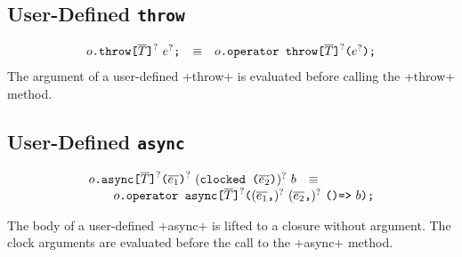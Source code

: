 \subsection{User-Defined \texttt{throw}}

$$
\begin{array}{rcl}
  {o}\texttt{.throw}\texttt{[}{\overline{T}}\texttt{]}^?~{e}^?\texttt{;}
  & \equiv &
  {o}\texttt{.operator throw}\texttt{[}{\overline{T}}\texttt{]}^?\texttt{(}{e}^?\texttt{);}
\end{array}
$$
The argument of a user-defined \xcd+throw+ is evaluated before
calling the \xcd+throw+ method.


\subsection{User-Defined \texttt{async}}
$$
\begin{array}{rcl}
  \usrAsync{o}{\overline{T}}{\overline{e_1}}{\overline{e_2}}{b}
  & \equiv &
  \\
  \multicolumn{3}{r}{
  \qquad  \libAsync{o}{\overline{T}}{\overline{e_1}}{\overline{e_2}}{b}
  }
\end{array}
$$

The body of a user-defined \xcd+async+ is lifted to a closure without
argument. The clock arguments are evaluated before the call to the
\xcd+async+ method.

